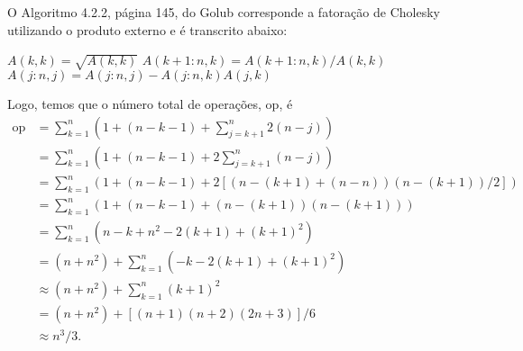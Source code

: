 \documentclass[a4paper,12pt, leqno, answers]{exam}
\begin{document}
\begin{questions}
\begin{solution}
        O Algoritmo 4.2.2, p\'{a}gina 145, do Golub\nocite{Golub:1996:matrix} corresponde a fatora\c{c}\~{a}o de Cholesky utilizando o produto externo e \'{e} transcrito abaixo:
        \begin{algorithmic}
                \State $A(k,k) = \sqrt{A(k,k)}$ 
                \State $A(k + 1:n, k) = A(k + 1:n, k) / A(k,k)$ 
                    \State $A(j:n, j) = A(j:n, j) - A(j:n, k) A(j, k)$ 
                \EndFor
            \EndFor
        \end{algorithmic}
        Logo, temos que o n\'{u}mero total de opera\c{c}\~{o}es, $\text{op}$, \'{e}
        \begin{align*}
            \text{op} &= \sum_{k = 1}^n \left( 1 + \left( n - k - 1 \right) + \sum_{j = k + 1}^n 2 \left( n - j \right) \right) \\
            &= \sum_{k = 1}^n \left( 1 + \left( n - k - 1 \right) + 2 \sum_{j = k + 1}^n \left( n - j \right) \right) \\
            &= \sum_{k = 1}^n \left( 1 + \left( n - k - 1 \right) + 2 \left[ \left( n - \left( k + 1 \right) + \left( n - n \right) \right) \left( n - \left( k + 1 \right) \right) / 2 \right] \right) \\
            &= \sum_{k = 1}^n \left( 1 + \left( n - k - 1 \right) + \left( n - \left( k + 1 \right) \right) \left( n - \left( k + 1 \right) \right) \right) \\
            &= \sum_{k = 1}^n \left( n - k + n^2 - 2 \left( k + 1 \right) + \left( k + 1 \right)^2 \right) \\
            &= \left( n + n^2 \right) + \sum_{k = 1}^n \left( - k  - 2 \left( k + 1 \right) + \left( k + 1 \right)^2 \right) \\
            &\approx \left( n + n^2 \right) + \sum_{k = 1}^n \left( k + 1 \right)^2 \\
            &= \left( n + n^2 \right) + \left[ \left( n + 1 \right) \left( n + 2 \right) \left( 2n + 3 \right) \right]  / 6 \\
            &\approx n^3 / 3.
        \end{align*}
    \end{solution}


\end{questions}
\end{document}
